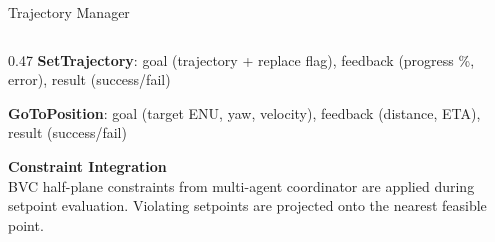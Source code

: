 \documentclass[aspectratio=169, 10pt]{beamer}
\begin{document}
\begin{frame}{Trajectory Manager}
\begin{columns}[T]
\begin{column}{0.47\textwidth}
\vspace{0.2em}
\scriptsize
\textbf{SetTrajectory}: goal (trajectory + replace flag), feedback (progress \%, error), result (success/fail)

\vspace{0.2em}
\textbf{GoToPosition}: goal (target ENU, yaw, velocity), feedback (distance, ETA), result (success/fail)

\vspace{0.3em}
\small\textbf{Constraint Integration}\\[0.1em]
\scriptsize
BVC half-plane constraints from multi-agent coordinator are applied during setpoint evaluation. Violating setpoints are projected onto the nearest feasible point.
\end{column}
\end{columns}
\end{frame}
\end{document}
